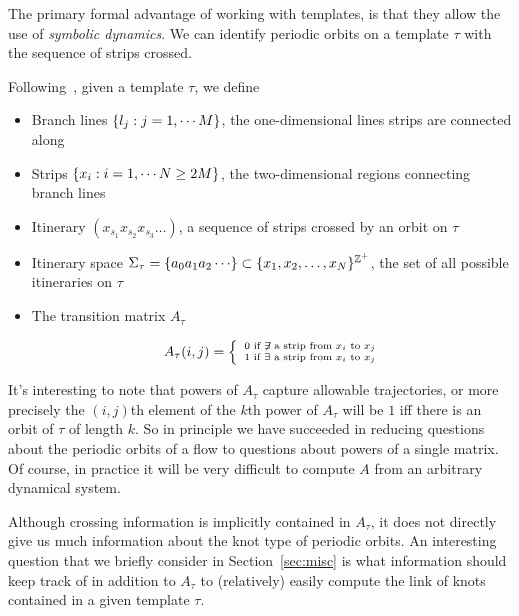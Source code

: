 \documentclass[paper.tex]{subfiles}
\begin{document}
The primary formal advantage of working with templates, is that they allow the use of \emph{symbolic dynamics}. We can identify periodic orbits on a template $\tau$ with the sequence of strips crossed.

\begin{definition}
  Following~\cite{knottyode}, given a template $\tau$, we define
  \begin{itemize}
    \item Branch lines  $\{ l_j : j = 1, \cdots M \}$, the one-dimensional lines strips are connected along
    \item Strips $\{ x_i : i = 1, \cdots N \geq 2 M \}$, the two-dimensional regions connecting branch lines
    \item Itinerary $(x_{s_1}x_{s_2}x_{s_3} \dots)$, a sequence of strips crossed by an orbit on $\tau$
    \item Itinerary space $\Sigma_\tau = \set{a_0 a_1 a_2 \cdots} \subset \set{x_1, x_2, \ldots, x_N}^{\Z^+}$, the set of all possible itineraries on $\tau$
    \item The transition matrix $A_\tau$

      \begin{equation}
        A_\tau(i,j) = \left\{ \
        \begin{smallmatrix}
          0 \text{ if } \not\exists \text{ a strip from } x_i \text{ to } x_j \\
          1 \text{ if } \exists \text{ a strip from } x_i \text{ to } x_j
        \end{smallmatrix}
        \right.
      \end{equation}
  \end{itemize}
\end{definition}

It's interesting to note that powers of $A_\tau$ capture allowable trajectories, or more precisely the $(i,j)$th element of the $k$th power of $A_\tau$ will be $1$ iff there is an orbit of $\tau$ of length $k$.
So in principle we have succeeded in reducing questions about the periodic orbits of a flow to questions about powers of a single matrix. Of course, in practice it will be very difficult to compute $A$ from an arbitrary
dynamical system.

Although crossing information is implicitly contained in $A_\tau$, it does not directly give us much information about the knot type of periodic orbits.
\acom{come back to this}
 An interesting question that we briefly consider
in Section~\ref{sec:misc} is what information should keep track of in addition to $A_\tau$ to (relatively) easily compute the link of knots contained in a given template $\tau$.
\end{document}

